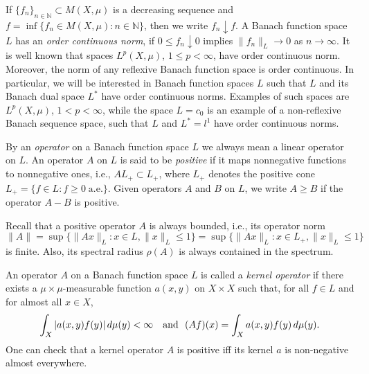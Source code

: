 \documentclass[12pt, reqno]{amsart}
\theoremstyle{definition}
\theoremstyle{remark}
\numberwithin{equation}{section}
\newcommand{\be}{\begin{equation}}
\newcommand{\ee}{\end{equation}}
\newcommand{\NN}{\mathbb{N}}
\begin{document}
If $\{f_n\}_{n\in \mathbb{N}} \subset M(X,\mu)$ is a decreasing sequence and
$f=\inf\{f_n \in M(X,\mu): n \in \NN \}$, then we write $f_n \downarrow f$. %
A Banach function space $L$ has an {\it order continuous norm}, if $0\le f_n \downarrow 0$
implies $\|f_n\|_L \to 0$ as $n \to \infty$. It is well known that spaces $L^p  (X,\mu)$, $1\le p< \infty$, have order continuous
norm. Moreover, the norm of any reflexive Banach function space is
order continuous. %
In particular, we will be interested in  Banach function spaces $L$ such that $L$ and its Banach dual space $L^*$ have order continuous norms. Examples of such spaces are $L^p  (X,\mu)$, $1< p< \infty$, while the space
$L=c_0$ %
is an example of a non-reflexive Banach sequence space, such that $L$ and  $L^*=l^1$ have order continuous
norms. %
  
By an {\it operator} on a Banach function space $L$ we always mean a linear
operator on $L$.  An operator $A$ on $L$ is said to be {\it positive}
if it maps nonnegative functions to nonnegative ones, i.e., $AL_+ \subset L_+$, where $L_+$ denotes the positive cone $L_+ =\{f\in L : f\ge 0 \; \mathrm{a.e.}\}$.
Given operators $A$ and $B$ on $L$, we write $A \ge B$ if the operator $A - B$ is positive.

Recall that a positive  operator $A$ is always bounded, i.e., its operator norm
\be
\|A\|=\sup\{\|Ax\|_L : x\in L, \|x\|_L \le 1\}=\sup\{\|Ax\|_L : x\in L_+, \|x\|_L \le 1\}
\label{equiv_op}
\ee
is finite.
Also, its spectral radius $\rho (A)$ is always contained in the spectrum.


An operator $A$ on a Banach function space $L$ is called a {\it kernel operator} if
there exists a $\mu \times \mu$-measurable function
$a(x,y)$ on $X \times X$ such that, for all $f \in L$ and for almost all $x \in X$,
$$ \int_X |a(x,y) f(y)| \, d\mu(y) < \infty \ \ \ {\rm and} \ \
   (Af)(x) = \int_X a(x,y) f(y) \, d\mu(y)  .$$
One can check that a kernel operator $A$ is positive iff
its kernel $a$ is non-negative almost everywhere.
\end{document}
